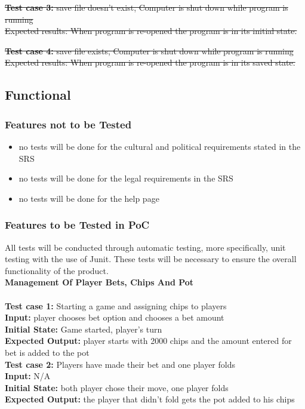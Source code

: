 \documentclass[12pt]{article}
\begin{document}
	\sout{\textbf{Test case 3: }save file doesn’t exist, Computer is shut down while program is running
\\Expected results: When program is re-opened the program is in its initial state.}

	\sout{\textbf{Test case 4: } save file exists, Computer is shut down while program is running
\\Expected results: When program is re-opened the program is in its saved state.}

	\subsection{Functional}
	\subsubsection{Features not to be Tested}
	\begin{itemize}
	\item no tests will be done for the cultural and political requirements stated in the SRS
	\item no tests will be done for the legal requirements in the SRS
	\item no tests will be done for the help page	
	\end{itemize}
	
	\subsubsection{Features to be Tested in PoC}
	All tests will be conducted through automatic testing, more specifically, unit testing with the use of Junit. These tests will be necessary to ensure the overall functionality of the product.\\

	\noindent \textbf{Management Of Player Bets, Chips And Pot}\\
	\\
	\textbf{Test case 1:} Starting a game and assigning chips to players \\
    \textbf{Input:} player chooses bet option and chooses a bet amount\\
    \textbf{Initial State:} Game started, player’s turn\\
	\textbf{Expected Output:} player starts with 2000 chips and the amount entered for bet is added to the pot\\
    
    \noindent \textbf{Test case 2:} Players have made their bet and one player folds\\
    \textbf{Input:} N/A\\
    \textbf{Initial State:} both player chose their move, one player folds\\
    \textbf{Expected Output:} the player that didn’t fold gets the pot added to his chips\\
\end{document}
